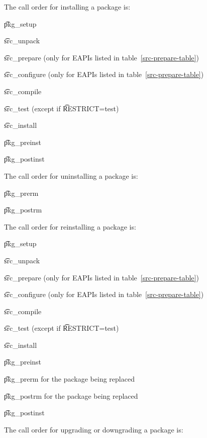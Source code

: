 The call order for installing a package is:

\begin{compactitem}
\item \t{pkg\_setup}
\item \t{src\_unpack}
\item \t{src\_prepare} (only for EAPIs listed in table~\ref{src-prepare-table})
\item \t{src\_configure} (only for EAPIs listed in table~\ref{src-prepare-table})
\item \t{src\_compile}
\item \t{src\_test} (except if \t{RESTRICT=test})
\item \t{src\_install}
\item \t{pkg\_preinst}
\item \t{pkg\_postinst}
\end{compactitem}

The call order for uninstalling a package is:

\begin{compactitem}
\item \t{pkg\_prerm}
\item \t{pkg\_postrm}
\end{compactitem}

The call order for reinstalling a package is:

\begin{compactitem}
\item \t{pkg\_setup}
\item \t{src\_unpack}
\item \t{src\_prepare} (only for EAPIs listed in table~\ref{src-prepare-table})
\item \t{src\_configure} (only for EAPIs listed in table~\ref{src-prepare-table})
\item \t{src\_compile}
\item \t{src\_test} (except if \t{RESTRICT=test})
\item \t{src\_install}
\item \t{pkg\_preinst}
\item \t{pkg\_prerm} for the package being replaced
\item \t{pkg\_postrm} for the package being replaced
\item \t{pkg\_postinst}
\end{compactitem}

The call order for upgrading or downgrading a package is:

